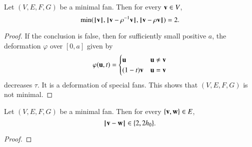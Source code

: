 \begin{lemma}\guid{}
Let $(V,E,F,G)$ be a minimal fan.  Then for every $\v\in V$,
$$
\min(\normo{\v},\norm{\v}{\rho^{-1}\v},\norm{\v}{\rho \v}) = 2.
$$
\end{lemma}

\begin{proof} If the conclusion is false, then for sufficiently small positive $a$,  the deformation $\varphi$ over $[0,a]$ given by
$$
\varphi(\u,t) =
\begin{cases}
\u & \u \ne \v\\
(1-t) \v & \u = \v\\
\end{cases}
$$
decreases $\tau$.  It is a deformation of special fans.  This shows that $(V,E,F,G)$ is not minimal.
\end{proof}

\begin{lemma}\guid{}
Let $(V,E,F,G)$ be a minimal fan.  Then for every $\{\v,\w\}\in E$,
$$
\norm{\v}{\w} \in \{2,2\hm\}.
$$
\end{lemma}

\begin{proof}
\end{proof}




%
%


%
%

